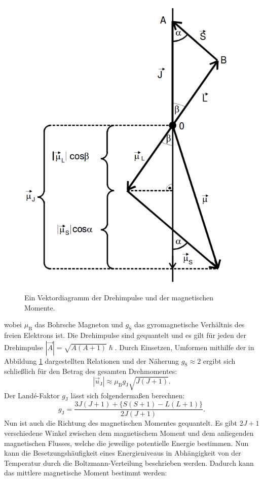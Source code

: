 \begin{figure}
	\centering
	\caption{Ein Vektordiagramm der Drehimpulse und der magnetischen Momente.}
	\includegraphics[width=\linewidth-70pt,height=\textwidth-200pt,keepaspectratio]{content/images/Vektordiagramm.png}
	\label{fig:Vektordiagramm}
\end{figure}
wobei $\mu_\text{B}$ das Bohrsche Magneton und $g_\text{S}$ das gyromagnetische Verhältnis des freien Elektrons ist. Die Drehimpulse sind gequantelt und es gilt für jeden der Drehimpulse $|\vec{A}|= \sqrt{A(A+1)} \hslash$. Durch Einsetzen, Umformen mithilfe der in Abbildung \ref{fig:Vektordiagramm} dargestellten Relationen und der Näherung $g_\text{S}\approx 2$ ergibt sich schließlich für den Betrag des gesamten Drehmomentes:
\begin{equation}
	|\vec{u}_\text{J}|\approx \mu_\text{B} g_\text{J} \sqrt{J(J+1)} \text{.}
\end{equation}
Der Landé-Faktor $g_\text{J}$ lässt sich folgendermaßen berechnen:
\begin{equation}
	g_\text{J}=\frac{3 J(J+1) + \{S(S+1) - L(L+1)\}}{2 J(J+1)}\text{.}\label{eq:g_J}
\end{equation}
Nun ist auch die Richtung des magnetischen Momentes gequantelt. Es gibt $2 J +1$ verschiedene Winkel zwischen dem magnetischem Moment und dem anliegenden magnetischen Flusses, welche die jeweilige potentielle Energie bestimmen. Nun kann die Besetzungshäufigkeit eines Energieniveaus in Abhängigkeit von der Temperatur durch die Boltzmann-Verteilung beschrieben werden. Dadurch kann das mittlere magnetische Moment bestimmt werden:
